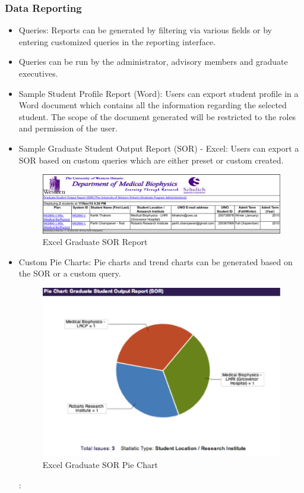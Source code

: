 \documentclass[11pt,a4paper]{report}
\begin{document}
\subsubsection{Data Reporting}
\begin{itemize}
\item Queries: Reports can be generated by filtering via various fields or by entering customized queries in the reporting interface.
\item Queries can be run by the administrator, advisory members and graduate executives.
\item Sample Student Profile Report (Word): Users can export student profile in a Word document which contains all the information regarding the selected student. The scope of the document generated will be restricted to the roles and permission of the user.
\item Sample Graduate Student Output Report (SOR) - Excel: Users can export a SOR based on custom queries which are either preset or custom created.

\begin{figure}[htp]
\centering
\includegraphics[scale=1]{diagrams/HTMLTemplating/SOR_Excel.png}
\caption{Excel Graduate SOR Report}
\label{fig:ExcelSOR}
\end{figure}

\item Custom Pie Charts: Pie charts and trend charts can be generated based on the SOR or a custom query.

\begin{figure}[htp]
\centering
\includegraphics[scale=1]{diagrams/HTMLTemplating/PieChart.png}
\caption{Excel Graduate SOR Pie Chart}
\label{fig:PieSOR}
\end{figure}

:\end{itemize}
\end{document}
